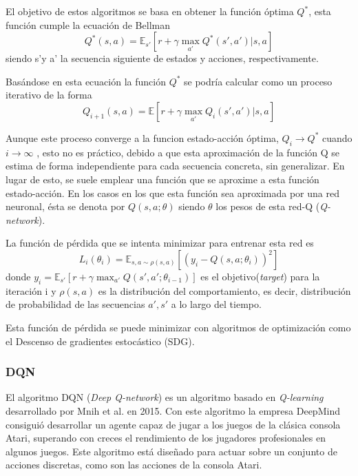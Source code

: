 El objetivo de estos algoritmos se basa en obtener la función óptima $Q^*$, esta función cumple la ecuación de Bellman 
	\begin{equation}
		Q^*(s,a)= \mathbb{E}_{s'}\left[r+\gamma\;\underset{a'}{\text{max}}\; Q^*(s',a')\big|s,a\right]
	\end{equation}
siendo s'y a' la secuencia siguiente de estados y acciones, respectivamente.

Basándose en esta ecuación la función $Q^*$ se podría calcular como un proceso iterativo de la forma
	\begin{equation}
	Q_{i+1}(s,a)= \mathbb{E}\left[r+\gamma\;\underset{a'}{\text{max}}\; Q_i(s',a')\big|s,a\right]
	\end{equation}

Aunque este proceso converge a la funcion estado-acción óptima, $Q_i \rightarrow Q^*$ cuando $i \rightarrow \infty$ \cite{sutton2018reinforcement}, esto no es práctico, debido a que esta aproximación de la función Q se estima de forma independiente para cada secuencia concreta, sin generalizar. En lugar de esto, se suele emplear una función que se aproxime a esta función estado-acción. En los casos en los que esta función sea aproximada por una red neuronal, ésta se denota por $Q(s,a; \theta)$ siendo $\theta$ los pesos de esta red-Q (\textit{Q-network}). 

La función de pérdida que se intenta minimizar para entrenar esta red es
\begin{equation}\label{eq:1}
	L_i(\theta_i) = \mathbb{E}_{s,a\sim\rho(s,a)}\left[\left(y_i - Q(s,a;\theta_i)\right)^2\right]
\end{equation} 
donde $y_i= \mathbb{E}_{s'}[ r + \gamma \; {\text{max}_{a'}} \; Q(s',a';\theta_{i-1})]$ es el objetivo(\textit{target}) para la iteración i y $\rho(s,a)$ es la distribución del comportamiento, es decir, distribución de probabilidad de las secuencias $a', s'$ a lo largo del tiempo.

Esta función de pérdida se puede minimizar con algoritmos de optimización como el Descenso de gradientes estocástico (SDG).

\subsubsection{DQN}

El algoritmo DQN (\textit{Deep Q-network}) es un algoritmo basado en \textit{Q-learning} desarrollado por Mnih et al.  en 2015. Con este algoritmo la empresa DeepMind consiguió desarrollar un agente capaz de jugar a los juegos de la clásica consola Atari, superando con creces el rendimiento de los jugadores profesionales en algunos juegos. Este algoritmo está diseñado para actuar sobre un conjunto de acciones discretas, como son las acciones de la consola Atari.

